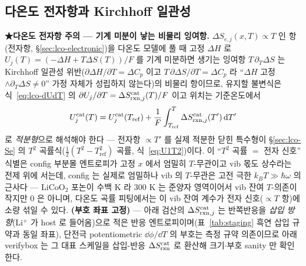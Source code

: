 \subsection{다온도 전자항과 Kirchhoff 일관성}\label{sec:lco-center-kirchhoff}
\textbf{★다온도 전자항 주의 --- 기계 미분이 낳는 비물리 잉여항.} $\Delta S_{e,j}(x,T)\propto T$
인 항(전자항, \S\ref{sec:lco-electronic})을 다온도 모델에 풀 때 고정 $\Delta H$ 로 $U_j(T)=(-\Delta H+T\Delta S(T))/F$ 를 기계 미분하면 생기는
잉여항 $T\,\partial_T\Delta S$ 는 Kirchhoff 일관성 위반($\partial\Delta H/\partial T=\Delta C_p$ 이고
$T\,\partial\Delta S/\partial T=\Delta C_p$ 라 ``$\Delta H$ 고정$\wedge\partial_T\Delta S\ne0$'' 가정 자체가
성립하지 않는다)의 비물리 항이므로, 유지할 불변식은 식~\eqref{eq:lco-dUdT} 의
$\partial U_j/\partial T=\Delta S_{\mathrm{rxn},j}^\mathrm{cat}(T)/F$ 이고 위치는 기준온도에서
\begin{equation}
U_j^\mathrm{cat}(T)=U_j^\mathrm{cat}(T_\mathrm{ref})+\frac1F\int_{T_\mathrm{ref}}^{T}\Delta S_{\mathrm{rxn},j}^\mathrm{cat}(T')\,\mathrm{d} T'
\label{eq:lco-kirchhoff}
\end{equation}
로 \emph{적분형}으로 해석해야 한다 --- 전자항 $\propto T'$ 를 실제 적분한 닫힌 특수형이 \S\ref{sec:lco-Se} 의
$T^2$ 곡률식($\tfrac12(T^2-T_\mathrm{ref}^2)$ 곡률, 식~\eqref{eq:U1T2})이다. 이 ``$T^2$ 곡률 $=$ 전자 신호'' 식별은 config 부분몰 엔트로피가
고정 $x$ 에서 엄밀히 $T$-무관이고 vib 몫도 상수라는 전제 위에 서는데, config 는 실제로 엄밀하나 vib 의 $T$-무관은
고전 극한 $k_BT\gg\hbar\omega$ 의 근사다 --- $\mathrm{LiCoO_2}$ 포논이 수백 K 라 $300$ K 는 준양자 영역이어서 vib 잔여
$T$-의존이 작지만 $0$ 은 아니며, 다온도 곡률 피팅에서는 이 vib 잔여 계수가 전자 신호($\propto T$ 항)에 소량 섞일 수 있다.
\textbf{(부호 좌표 고정)} --- 아래 검산의 $\Delta S_{\mathrm{rxn},j}^\mathrm{cat}$ 는 반쪽반응을
\emph{삽입 방향}(Li$^+$ 가 host 로 들어옴)으로 적은 반응 엔트로피이며(표~\ref{tab:staging} 흑연 삽입 규약과
동일 좌표), 단전극 potentiometric $\dd\phi/\dd T$ 의 부호는 측정 규약 의존이므로 아래 verifybox 는 그
대표 스케일을 삽입-반응 $\Delta S_{\mathrm{rxn}}^\mathrm{cat}$ 로 환산해 크기$\cdot$부호 sanity 만 확인한다.


